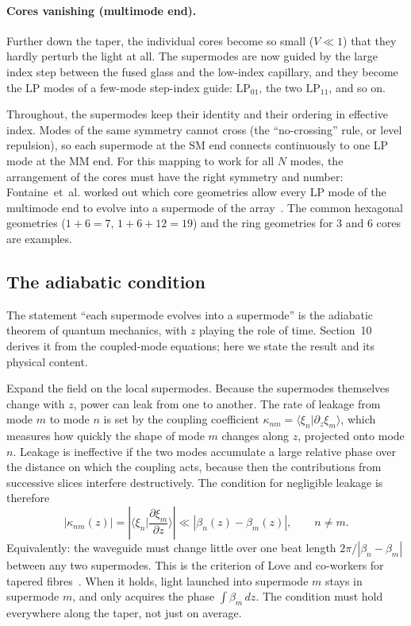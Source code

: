 \documentclass[11pt,a4paper]{article}
\newcommand{\braket}[2]{\langle #1|#2\rangle}
\begin{document}
\paragraph{Cores vanishing (multimode end).} Further down the taper, the individual cores become so small ($V \ll 1$) that they hardly perturb the light at all. The supermodes are now guided by the large index step between the fused glass and the low-index capillary, and they become the LP modes of a few-mode step-index guide: $\mathrm{LP}_{01}$, the two $\mathrm{LP}_{11}$, and so on.

Throughout, the supermodes keep their identity and their ordering in effective index. Modes of the same symmetry cannot cross (the ``no-crossing'' rule, or level repulsion), so each supermode at the SM end connects continuously to one LP mode at the MM end. For this mapping to work for all $N$ modes, the arrangement of the cores must have the right symmetry and number: Fontaine~et~al. worked out which core geometries allow every LP mode of the multimode end to evolve into a supermode of the array~\cite{Fontaine2012}. The common hexagonal geometries ($1+6=7$, $1+6+12=19$) and the ring geometries for 3 and 6 cores are examples.

\subsection{The adiabatic condition}
The statement ``each supermode evolves into a supermode'' is the adiabatic theorem of quantum mechanics, with $z$ playing the role of time. Section~10 derives it from the coupled-mode equations; here we state the result and its physical content.

Expand the field on the local supermodes. Because the supermodes themselves change with $z$, power can leak from one to another. The rate of leakage from mode $m$ to mode $n$ is set by the coupling coefficient $\kappa_{nm} = \braket{\xi_n}{\partial_z \xi_m}$, which measures how quickly the shape of mode $m$ changes along $z$, projected onto mode $n$. Leakage is ineffective if the two modes accumulate a large relative phase over the distance on which the coupling acts, because then the contributions from successive slices interfere destructively. The condition for negligible leakage is therefore
\begin{equation}
|\kappa_{nm}(z)| = \left| \braket{\xi_n}{\frac{\partial \xi_m}{\partial z}} \right| \ll |\beta_n(z) - \beta_m(z)|,
\qquad n \neq m.
\label{eq:adiabatic}
\end{equation}
Equivalently: the waveguide must change little over one beat length $2\pi/|\beta_n - \beta_m|$ between any two supermodes. This is the criterion of Love and co-workers for tapered fibres~\cite{Love1991}. When it holds, light launched into supermode $m$ stays in supermode $m$, and only acquires the phase $\int \beta_m\,dz$. The condition must hold everywhere along the taper, not just on average.
\end{document}
